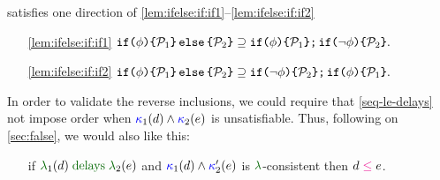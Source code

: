 \PwTmca{} satisfies one direction of
\eqref{lem:ifelse:if:if1}--\eqref{lem:ifelse:if:if2}
\begin{enumerate}
\item[\eqref{lem:ifelse:if:if1}]
  \begin{math} 
    \xIFTHEN{\aForm}{\aPSS_1}{\aPSS_2}
    \supseteq
    \xSEMI{
      \xIFTHEN{\aForm}{\aPSS_1}{}
    }{
      \xIFTHEN{\lnot\aForm}{\aPSS_2}{}
    }.
  \end{math}
  
\item[\eqref{lem:ifelse:if:if2}]
  \begin{math} 
    \xIFTHEN{\aForm}{\aPSS_1}{\aPSS_2}
    \supseteq
    \xSEMI{
      \xIFTHEN{\lnot\aForm}{\aPSS_2}{}
    }{
      \xIFTHEN{\aForm}{\aPSS_1}{}
    }.
  \end{math}
\end{enumerate}
In order to validate the reverse inclusions, we could require that
\ref{seq-le-delays} not impose order when
${\color{blue}\kappa}_1(d) \land {\color{blue}\kappa}_2(e)$ is unsatisfiable.
Thus, following on \textsection\ref{sec:false}, we would also like this:
\begin{enumerate}
\item[{\labeltext[\textsc{s}6b$'$]{(\textsc{s}6b$'$)}{seq-le-delays'}}] if
  $\labeling_1(\bEv) \rdelays \labeling_2(\aEv)$ and
  ${\color{blue}\kappa}_1(d) \land {\color{blue}\kappa}_2'(e)$ is
  $\labeling$-consistent then $\bEv\le\aEv$.
\end{enumerate}

